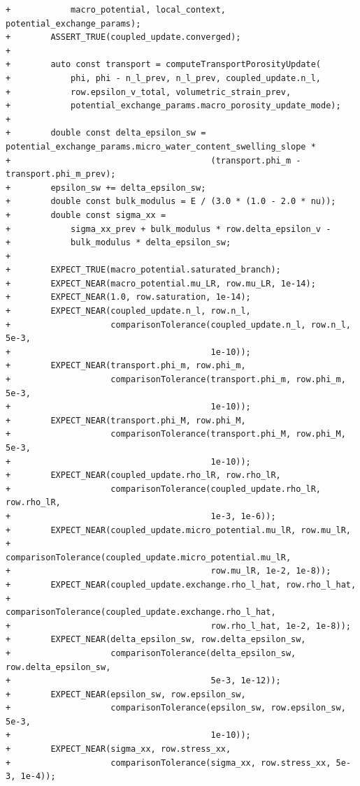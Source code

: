 \documentclass[10pt]{article}
\begin{document}
\begin{lstlisting}
+            macro_potential, local_context, potential_exchange_params);
+        ASSERT_TRUE(coupled_update.converged);
+
+        auto const transport = computeTransportPorosityUpdate(
+            phi, phi - n_l_prev, n_l_prev, coupled_update.n_l,
+            row.epsilon_v_total, volumetric_strain_prev,
+            potential_exchange_params.macro_porosity_update_mode);
+
+        double const delta_epsilon_sw = potential_exchange_params.micro_water_content_swelling_slope *
+                                        (transport.phi_m - transport.phi_m_prev);
+        epsilon_sw += delta_epsilon_sw;
+        double const bulk_modulus = E / (3.0 * (1.0 - 2.0 * nu));
+        double const sigma_xx =
+            sigma_xx_prev + bulk_modulus * row.delta_epsilon_v -
+            bulk_modulus * delta_epsilon_sw;
+
+        EXPECT_TRUE(macro_potential.saturated_branch);
+        EXPECT_NEAR(macro_potential.mu_LR, row.mu_LR, 1e-14);
+        EXPECT_NEAR(1.0, row.saturation, 1e-14);
+        EXPECT_NEAR(coupled_update.n_l, row.n_l,
+                    comparisonTolerance(coupled_update.n_l, row.n_l, 5e-3,
+                                        1e-10));
+        EXPECT_NEAR(transport.phi_m, row.phi_m,
+                    comparisonTolerance(transport.phi_m, row.phi_m, 5e-3,
+                                        1e-10));
+        EXPECT_NEAR(transport.phi_M, row.phi_M,
+                    comparisonTolerance(transport.phi_M, row.phi_M, 5e-3,
+                                        1e-10));
+        EXPECT_NEAR(coupled_update.rho_lR, row.rho_lR,
+                    comparisonTolerance(coupled_update.rho_lR, row.rho_lR,
+                                        1e-3, 1e-6));
+        EXPECT_NEAR(coupled_update.micro_potential.mu_lR, row.mu_lR,
+                    comparisonTolerance(coupled_update.micro_potential.mu_lR,
+                                        row.mu_lR, 1e-2, 1e-8));
+        EXPECT_NEAR(coupled_update.exchange.rho_l_hat, row.rho_l_hat,
+                    comparisonTolerance(coupled_update.exchange.rho_l_hat,
+                                        row.rho_l_hat, 1e-2, 1e-8));
+        EXPECT_NEAR(delta_epsilon_sw, row.delta_epsilon_sw,
+                    comparisonTolerance(delta_epsilon_sw, row.delta_epsilon_sw,
+                                        5e-3, 1e-12));
+        EXPECT_NEAR(epsilon_sw, row.epsilon_sw,
+                    comparisonTolerance(epsilon_sw, row.epsilon_sw, 5e-3,
+                                        1e-10));
+        EXPECT_NEAR(sigma_xx, row.stress_xx,
+                    comparisonTolerance(sigma_xx, row.stress_xx, 5e-3, 1e-4));

\end{lstlisting}
\end{document}
